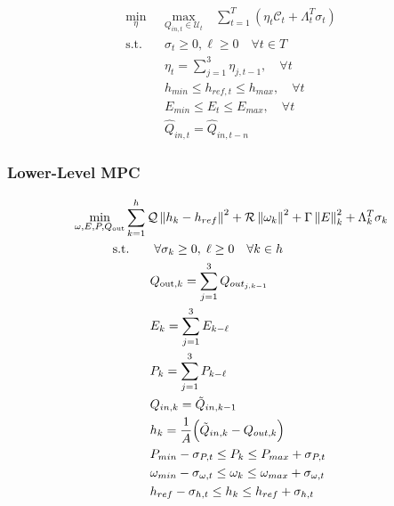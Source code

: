 \begin{subequations}\label{P0:min_max}
	\begin{align}
		\underset{\eta}{\text{min}} & \underset{Q_{in,t} \in \mathcal{U}_t}{\text{max}} \quad \sum_{t=1}^{T} \left( \eta_t \mathcal{C}_t + \Lambda_t^T \sigma_t \right) \label{P0:min_max_1} \\
		\text{s.t.} \quad & \sigma_t \geq 0, \ell \geq 0  \quad \forall t \in T \label{P0:min_max_2} \\
		& \eta_{t} = \sum_{j=1}^3 \eta_{j,t-1}, \quad \forall t \label{P0:min_max_3} \\
		& h_{min} \leq h_{ref, t} \leq h_{max}, \quad \forall t \label{P0:min_max_5} \\
		& E_{min} \leq E_{t} \leq E_{max}, \quad \forall t \label{P0:min_max_6} \\
		& \hat{Q}_{in,t} = \hat{Q}_{in,t-n} \label{P0:min_max_7}
	\end{align}
	\end{subequations}

\subsubsection{Lower-Level MPC}
	\begin{subequations}\label{P2:FinalModel}
		\begin{align}
			\underset{\omega, E, P, Q_{\text{out}}}{\text{min}}& \sum_{k=1}^{h} \mathcal{Q} \left\lVert h_k - h_{ref} \right\rVert^2 + \mathcal{R} \left\lVert \omega_k \right\rVert^2 + \Gamma \left\lVert E \right\rVert^{2}_{k} + \Lambda_k^T \sigma_k  \label{P1:lower_mpc} \\
			&\hspace{-1em} \text{s.t.}  \quad \quad \forall \sigma_k \geq 0, \; \ell \geq 0 \quad \forall k \in h \label{P1:1} \\
			& \qquad Q_{\text{out}, k} = \sum_{j=1}^3 Q_{out_{j,k-1}} \label{P1:2} \\
			& \qquad E_{k} = \sum_{j=1}^3 E_{k-\ell} \label{P1:3}  \\
			& \qquad P_{k} = \sum_{j=1}^3 P_{k-\ell} \label{P1:4}  \\
			& \qquad Q_{in,k} = \tilde{Q}_{in,k-1} \label{P1:5}  \\
			& \qquad h_k = \frac{1}{A} \Big(\tilde{Q}_{in,k} - Q_{out,k}\Big) \label{P1:6} \\
			& \qquad P_{min} - \sigma_{P,t} \leq P_k \leq P_{max} + \sigma_{P,t} \label{P1:8} \\
			& \qquad \omega_{min} - \sigma_{\omega,t} \leq \omega_k \leq \omega_{max} + \sigma_{\omega,t} \label{P1:7} \\
			& \qquad h_{ref} - \sigma_{h,t} \leq h_k \leq h_{ref} + \sigma_{h,t} \label{P1:9}
	\end{align}
	\end{subequations}



